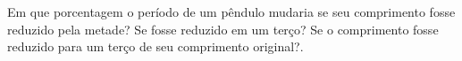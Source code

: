 Em que porcentagem o período de um pêndulo mudaria se seu comprimento fosse reduzido pela metade? Se fosse reduzido em um terço? Se o comprimento fosse reduzido para um terço de seu comprimento original?.

